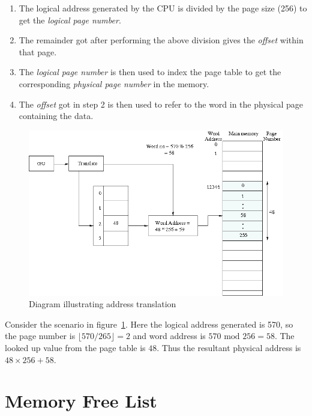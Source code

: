 \begin{enumerate}
	\item The logical address generated by the CPU is divided by the page size (256) to get the \emph{logical page number}.
	\item The remainder got after performing the above division gives the \emph{offset} within that page.
	\item The \emph{logical page number} is then used to index the page table to get the corresponding \emph{physical page number} in the memory.
	\item The \emph{offset} got in step 2 is then used to refer to the word in the physical page containing the data.\\
\end{enumerate}

\begin{figure}[h!]
	\centering
	\includegraphics[scale=0.55]{pics/paging_example}
	\caption{Diagram illustrating address translation}
	\label{fig:paging_example}
\end{figure}

\begin{example}
	Consider the scenario in figure~\ref{fig:paging_example}. Here the logical address generated is 570, so the page number is $ \lfloor 570/265 \rfloor = 2$ and word address is $570\mbox{ mod }256 = 58$. The looked up value from the page table is $48$. Thus the resultant physical address is $48 \times 256+58$.
\end{example}
	
\section{Memory Free List}
\label{lbl:memlst}

